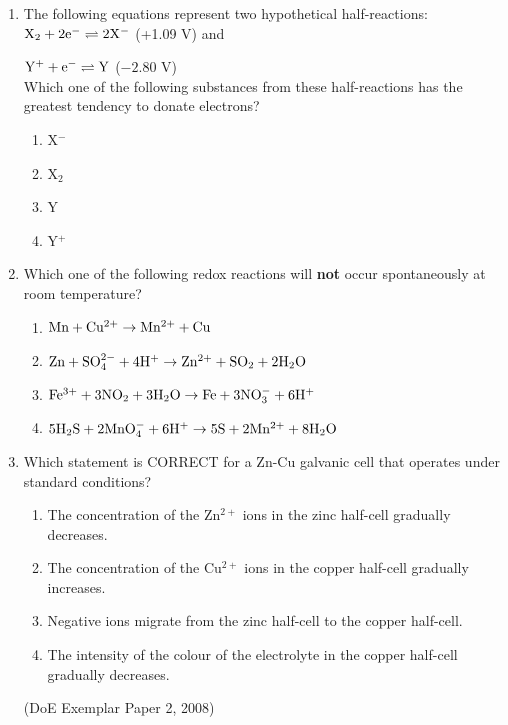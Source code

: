 \begin{eocexercises}{}
\begin{enumerate}
\begin{enumerate}
(IEB Paper 2, 2002)

	\item{The following equations represent two hypothetical half-reactions:\\

$\rm{X_{2} + 2e^{-} \rightleftharpoons 2X^{-}}$ (+1.09 V) and

$\rm{Y^{+} + e^{-} \rightleftharpoons Y}$ ($-2.80$ V)\\

Which one of the following substances from these half-reactions has the greatest tendency to donate electrons?}

		\begin{enumerate}
		\item{X$^{-}$}
		\item{X$_{2}$}
		\item{Y}
		\item{Y$^{+}$}
		\end{enumerate}


	\item{Which one of the following redox reactions will \textbf{not} occur spontaneously at room temperature?}

		\begin{enumerate}
		\item{$\rm{Mn + Cu^{2+} \rightarrow Mn^{2+} + Cu}$}
		\item{$\rm{Zn + SO_{4}^{2-} + 4H^{+} \rightarrow Zn^{2+} + SO_{2} + 2H_{2}O}$}
		\item{$\rm{Fe^{3+} + 3NO_{2} + 3H_{2}O \rightarrow Fe + 3NO_{3}^{-} + 6H^{+}}$}
		\item{$\rm{5H_{2}S + 2MnO_{4}^{-} + 6H^{+}\rightarrow 5S + 2Mn^{2+} + 8H_{2}O}$}
		\end{enumerate}

	\item{Which statement is CORRECT for a Zn-Cu galvanic cell that operates under standard conditions?}
		\begin{enumerate}
		\item{The concentration of the Zn$^{2+}$ ions in the zinc half-cell gradually decreases.}
		\item{The concentration of the Cu$^{2+}$ ions in the copper half-cell gradually increases.}
		\item{Negative ions migrate from the zinc half-cell to the copper half-cell.}
		\item{The intensity of the colour of the electrolyte in the copper half-cell gradually decreases.}
		\end{enumerate}
(DoE Exemplar Paper 2, 2008)


\end{enumerate}
\end{enumerate}
\end{eocexercises}
